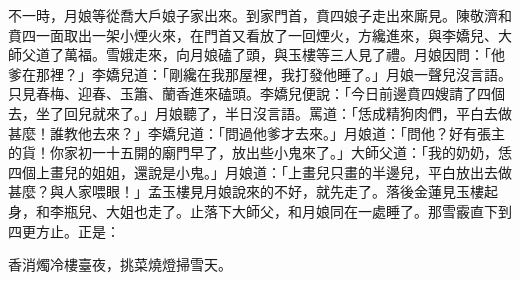不一時，月娘等從喬大戶娘子家出來。到家門首，賁四娘子走出來廝見。陳敬濟和賁四一面取出一架小煙火來，在門首又看放了一回煙火，方纔進來，與李嬌兒、大師父道了萬福。雪娥走來，向月娘磕了頭，與玉樓等三人見了禮。月娘因問：「他爹在那裡？」李嬌兒道：「剛纔在我那屋裡，我打發他睡了。」月娘一聲兒沒言語。只見春梅、迎春、玉簫、蘭香進來磕頭。李嬌兒便說：「今日前邊賁四嫂請了四個去，坐了回兒就來了。」月娘聽了，半日沒言語。罵道：「恁成精狗肉們，平白去做甚麼！誰教他去來？」李嬌兒道：「問過他爹才去來。」月娘道：「問他？好有張主的貨！你家初一十五開的廟門早了，放出些小鬼來了。」大師父道：「我的奶奶，恁四個上畫兒的姐姐，還說是小鬼。」月娘道：「上畫兒只畫的半邊兒，平白放出去做甚麼？與人家喂眼！」孟玉樓見月娘說來的不好，就先走了。落後金蓮見玉樓起身，和李瓶兒、大姐也走了。止落下大師父，和月娘同在一處睡了。那雪霰直下到四更方止。正是：

香消燭冷樓臺夜，挑菜燒燈掃雪天。

